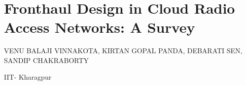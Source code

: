\chapter{Fronthaul Design in Cloud Radio Access Networks: A Survey}

\begin{center}
{\large\uppercase{Venu Balaji Vinnakota, Kirtan Gopal Panda, Debarati Sen, Sandip chakraborty}} 

\vskip -6pt

IIT- Kharagpur \\ 
\end{center}





\vfill

\newpage


